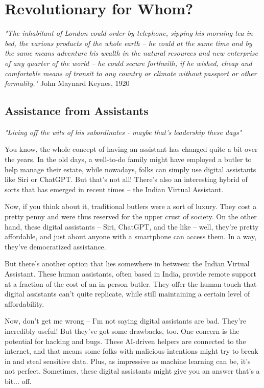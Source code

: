 \setchapterpreamble[u]{\margintoc}
\chapter{Revolutionary for Whom?}

\textit{"The inhabitant of London could order by telephone, sipping his morning tea in bed, the various products of the whole earth -- he could at the same time and by the same means adventure his wealth in the natural resources and new enterprise of any quarter of the world -- he could secure forthwith, if he wished, cheap and comfortable means of transit to any country or climate without passport or other formality."} John Maynard Keynes, 1920 \cite{Keynes2012}

\section{Assistance from Assistants}

\textit{"Living off the wits of his subordinates - maybe that's leadership these days"}\cite{Lecarre}

You know, the whole concept of having an assistant has changed quite a bit over the years. In the old days, a well-to-do family might have employed a butler to help manage their estate, while nowadays, folks can simply use digital assistants like Siri or ChatGPT. But that's not all! There's also an interesting hybrid of sorts that has emerged in recent times – the Indian Virtual Assistant.

Now, if you think about it, traditional butlers were a sort of luxury. They cost a pretty penny and were thus reserved for the upper crust of society. On the other hand, these digital assistants – Siri, ChatGPT, and the like – well, they're pretty affordable, and just about anyone with a smartphone can access them. In a way, they've democratized assistance.

But there's another option that lies somewhere in between: the Indian Virtual Assistant. These human assistants, often based in India, provide remote support at a fraction of the cost of an in-person butler. They offer the human touch that digital assistants can't quite replicate, while still maintaining a certain level of affordability.

Now, don't get me wrong – I'm not saying digital assistants are bad. They're incredibly useful! But they've got some drawbacks, too. One concern is the potential for hacking and bugs. These AI-driven helpers are connected to the internet, and that means some folks with malicious intentions might try to break in and steal sensitive data. Plus, as impressive as machine learning can be, it's not perfect. Sometimes, these digital assistants might give you an answer that's a bit... off.

